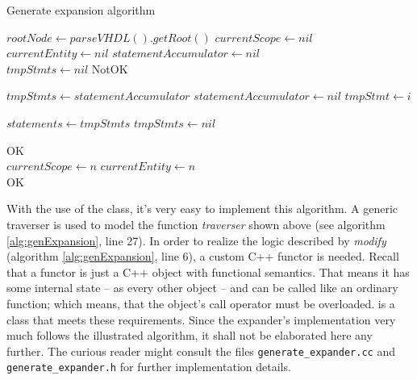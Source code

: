 \begin{algorithm}
    \caption{Generate expansion algorithm}
    \label{alg:genExpansion}
    \begin{algorithmic}[1]
        \State \(rootNode \gets parseVHDL().getRoot()\)
        \State \(currentScope \gets nil\)
        \State \(currentEntity \gets nil\)
        \State \(statementAccumulator \gets nil\)
        \\
        \State \(tmpStmts \gets nil\)
        \State \Return NotOK
        \EndIf

        \State {}
        \State \(tmpStmts \gets statementAccumulator\)
        \State \(statementAccumulator \gets nil\)
        \Else
        \State \(tmpStmt \gets i\)
        \EndIf
        \EndFor

        \State \(statements \gets tmpStmts\)
        \State \(tmpStmts \gets nil\)
        \EndWhile

        \State \Return OK
        \EndFunction
        \\
        \State \(currentScope \gets n\)
        \State \Return {}
        \EndIf
        \State \Return {}
        \EndIf
        \State \(currentEntity \gets n\)
        \EndIf
        \\
        \State {}
        \EndFor
        \State
        \State \Return OK
        \EndFunction
    \end{algorithmic}
\end{algorithm}

With the use of the  class, it's very easy to
implement this algorithm. A generic traverser is used to model the
function \emph{traverser} shown above (see algorithm
\ref{alg:genExpansion}, line 27). In order to realize the logic
described by \emph{modify} (algorithm \ref{alg:genExpansion}, line 6),
a custom
C++ functor is needed. Recall
that a functor is just a C++ object with functional semantics. That
means it has some internal state -- as every other object -- and
can be called like an ordinary function; which means, that the object's
call operator must be overloaded.  is a class
that meets these requirements. Since the expander's implementation very much
follows the illustrated algorithm, it shall not be elaborated here any
further. The curious reader might consult the files
\texttt{generate_expander.cc} and \texttt{generate_expander.h} for
further implementation details.

